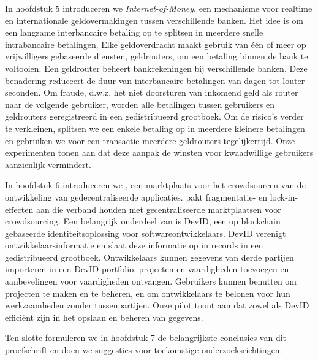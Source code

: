 {In hoofdstuk 5 introduceren we \emph{Internet-of-Money}, een mechanisme voor realtime en internationale geldovermakingen tussen verschillende banken.
Het idee is om een ​​langzame interbancaire betaling op te splitsen in meerdere snelle intrabancaire betalingen.
Elke geldoverdracht maakt gebruik van één of meer op vrijwilligers gebaseerde diensten, geldrouters, om een ​​betaling binnen de bank te voltooien.
Een geldrouter beheert bankrekeningen bij verschillende banken.
Deze benadering reduceert de duur van interbancaire betalingen van dagen tot louter seconden.
Om fraude, d.w.z. het niet doorsturen van inkomend geld als router naar de volgende gebruiker, worden alle betalingen tussen gebruikers en geldrouters geregistreerd in een gedistribueerd grootboek.
Om de risico's verder te verkleinen, splitsen we een enkele betaling op in meerdere kleinere betalingen en gebruiken we voor een transactie meerdere geldrouters tegelijkertijd.
Onze experimenten tonen aan dat deze aanpak de winsten voor kwaadwillige gebruikers aanzienlijk vermindert.

In hoofdstuk 6 introduceren we \emph{\Dappcoder{}}, een marktplaats voor het crowdsourcen van de ontwikkeling van gedecentraliseerde applicaties.
\Dappcoder{} pakt fragmentatie- en lock-in-effecten aan die verband houden met gecentraliseerde marktplaatsen voor crowdsourcing.
Een belangrijk onderdeel van \Dappcoder{} is DevID, een op blockchain gebaseerde identiteitsoplossing voor softwareontwikkelaars.
DevID verenigt ontwikkelaarsinformatie en slaat deze informatie op in records in een gedistribueerd grootboek.
Ontwikkelaars kunnen gegevens van derde partijen importeren in een DevID portfolio, projecten en vaardigheden toevoegen en aanbevelingen voor vaardigheden ontvangen.
Gebruikers kunnen \Dappcoder{} benutten om projecten te maken en te beheren, en om ontwikkelaars te belonen voor hun werkzaamheden zonder tussenpartijen.
Onze pilot toont aan dat zowel \Dappcoder{} als DevID efficiënt zijn in het opslaan en beheren van gegevens.

Ten slotte formuleren we in hoofdstuk 7 de belangrijkste conclusies van dit proefschrift en doen we suggesties voor toekomstige onderzoeksrichtingen.
}



